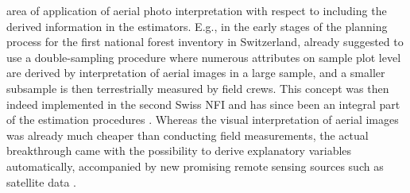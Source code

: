 area of application of aerial photo interpretation with respect to including the derived information in the estimators. E.g., in the early stages of the planning process for the first national forest inventory in Switzerland, \citet{schmid1970} already suggested to use a double-sampling procedure where numerous attributes on sample plot level are derived by interpretation of aerial images in a large sample, and a smaller subsample is then terrestrially measured by field crews. This concept was then indeed implemented in the second Swiss NFI and has since been an integral part of the estimation procedures \citep{brassel2001}. Whereas the visual interpretation of aerial images was already much cheaper than conducting field measurements, the actual breakthrough came with the possibility to derive explanatory variables automatically, accompanied by new promising remote sensing sources such as satellite data \citep{hildebrandt1987}.\par

